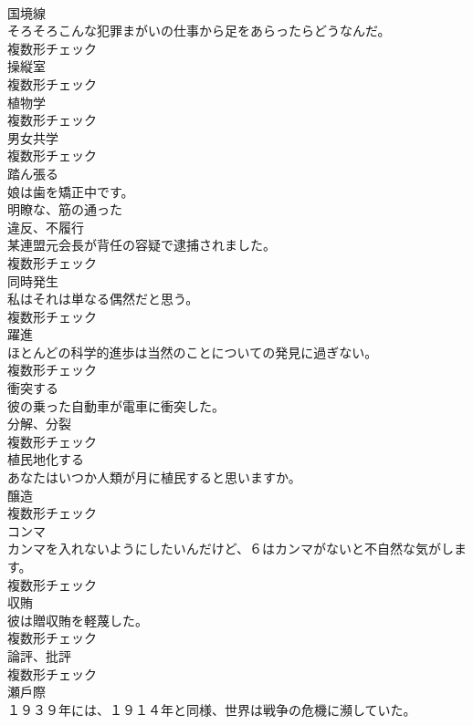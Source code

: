 \documentclass[8pt]{extreport}
\begin{document}
\begin{CJK}{UTF8}{min}
\\	[名詞]	国境線	
\\	そろそろこんな犯罪まがいの仕事から足をあらったらどうなんだ。	
\\	複数形チェック
\\	[名詞]	操縦室	
\\	複数形チェック
\\	[名詞]	植物学	
\\	複数形チェック
\\	[名詞]	男女共学	
\\	複数形チェック
\\	[動詞]	踏ん張る	
\\	娘は歯を矯正中です。	
\\	[形容詞]	明瞭な、筋の通った	
\\	[名詞]	違反、不履行	
\\	某連盟元会長が背任の容疑で逮捕されました。	
\\	複数形チェック
\\	[名詞]	同時発生	
\\	私はそれは単なる偶然だと思う。	
\\	複数形チェック
\\	[名詞]	躍進	
\\	ほとんどの科学的進歩は当然のことについての発見に過ぎない。	
\\	複数形チェック
\\	[動詞]	衝突する	
\\	彼の乗った自動車が電車に衝突した。	
\\	[名詞]	分解、分裂	
\\	複数形チェック
\\	[動詞]	植⺠地化する	
\\	あなたはいつか人類が月に植民すると思いますか。	
\\	[名詞]	醸造	
\\	複数形チェック
\\	[名詞]	コンマ	
\\	カンマを入れないようにしたいんだけど、６はカンマがないと不自然な気がします。	
\\	複数形チェック
\\	[名詞]	収賄	
\\	彼は贈収賄を軽蔑した。	
\\	複数形チェック
\\	[名詞]	論評、批評	
\\	複数形チェック
\\	[名詞]	瀬戶際	
\\	１９３９年には、１９１４年と同様、世界は戦争の危機に瀕していた。	

\end{CJK}
\end{document}
